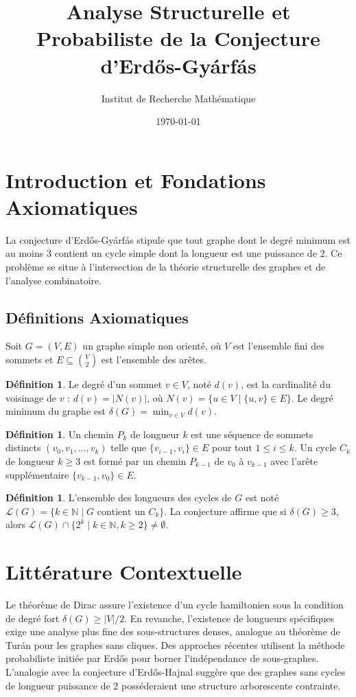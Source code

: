 \documentclass[11pt,a4paper]{article}
\title{Analyse Structurelle et Probabiliste de la Conjecture d'Erd\H{o}s-Gy\'arf\'as}
\author{Institut de Recherche Mathématique}
\date{\today}
\theoremstyle{definition}
\newtheorem{definition}[theorem]{Définition}
\begin{document}
\maketitle
\tableofcontents
\newpage

\section{Introduction et Fondations Axiomatiques}

La conjecture d'Erd\H{o}s-Gy\'arf\'as stipule que tout graphe dont le degré minimum est au moins $3$ contient un cycle simple dont la longueur est une puissance de $2$. Ce problème se situe à l'intersection de la théorie structurelle des graphes et de l'analyse combinatoire.

\subsection{Définitions Axiomatiques}
Soit $G = (V, E)$ un graphe simple non orienté, où $V$ est l'ensemble fini des sommets et $E \subseteq \binom{V}{2}$ est l'ensemble des arêtes.

\begin{definition}
Le degré d'un sommet $v \in V$, noté $d(v)$, est la cardinalité du voisinage de $v$ : $d(v) = |N(v)|$, où $N(v) = \{u \in V \mid \{u, v\} \in E\}$. Le degré minimum du graphe est $\delta(G) = \min_{v \in V} d(v)$.
\end{definition}

\begin{definition}
Un chemin $P_k$ de longueur $k$ est une séquence de sommets distincts $(v_0, v_1, \dots, v_k)$ telle que $\{v_{i-1}, v_i\} \in E$ pour tout $1 \le i \le k$.
Un cycle $C_k$ de longueur $k \ge 3$ est formé par un chemin $P_{k-1}$ de $v_0$ à $v_{k-1}$ avec l'arête supplémentaire $\{v_{k-1}, v_0\} \in E$.
\end{definition}

\begin{definition}
L'ensemble des longueurs des cycles de $G$ est noté $\mathcal{L}(G) = \{k \in \mathbb{N} \mid G \text{ contient un } C_k\}$.
La conjecture affirme que si $\delta(G) \ge 3$, alors $\mathcal{L}(G) \cap \{2^k \mid k \in \mathbb{N}, k \ge 2\} \neq \emptyset$.
\end{definition}

\section{Littérature Contextuelle}
Le théorème de Dirac assure l'existence d'un cycle hamiltonien sous la condition de degré fort $\delta(G) \ge |V|/2$. En revanche, l'existence de longueurs spécifiques exige une analyse plus fine des sous-structures denses, analogue au théorème de Tur\'an pour les graphes sans cliques.
Des approches récentes utilisent la méthode probabiliste initiée par Erd\H{o}s pour borner l'indépendance de sous-graphes. L'analogie avec la conjecture d'Erd\H{o}s-Hajnal suggère que des graphes sans cycles de longueur puissance de $2$ posséderaient une structure arborescente contrainte.
\end{document}
